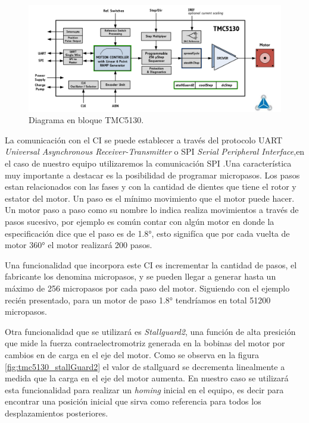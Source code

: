 \begin{figure}[h]
\centering 
\includegraphics[width=1\textwidth]{./Figures/tmc5130_diagrama.png}
\caption{Diagrama en bloque TMC5130.}
\label{fig:tmc5130_diagrama}
\end{figure}

La comunicación con el CI se puede establecer a través del protocolo UART \textit{Universal Asynchronous Receiver-Transmitter} o SPI \textit{Serial Peripheral Interface},en el caso de nuestro equipo utilizaremos la comunicación SPI  .Una característica muy importante a destacar es la posibilidad de programar micropasos. Los pasos estan relacionados con las fases  y con la cantidad de dientes que tiene el rotor y estator del motor. Un paso es el mínimo movimiento que el motor puede hacer. Un motor paso a paso como su nombre lo indica realiza movimientos a través de pasos sucesivo, por ejemplo es común contar con algún motor en donde la especificación dice que el paso es de \ang{1.8}, esto signifíca que por cada vuelta de motor \ang{360} el motor realizará 200 pasos.

Una funcionalidad que incorpora este CI es incrementar la cantidad de pasos, el fabricante los denomina micropasos, y se pueden llegar a generar hasta un máximo de 256 micropasos por cada paso del motor. Siguiendo con el ejemplo recién presentado, para un motor de paso \ang{1.8} tendríamos en total 51200 micropasos.


Otra funcionalidad que se utilizará es \textit{Stallguard2}, una función de alta presición que mide la fuerza contraelectromotriz generada en la bobinas del motor por cambios en de carga en el eje del motor. Como se observa en la figura \ref{fig:tmc5130_stallGuard2} el valor de stallguard se decrementa linealmente a medida que la carga en el eje del motor aumenta. En nuestro caso se utilizará esta funcionalidad para realizar un \textit{homing} inicial en el equipo, es decir para encontrar una posición inicial que sirva como referencia para todos los desplazamientos posteriores.
     
